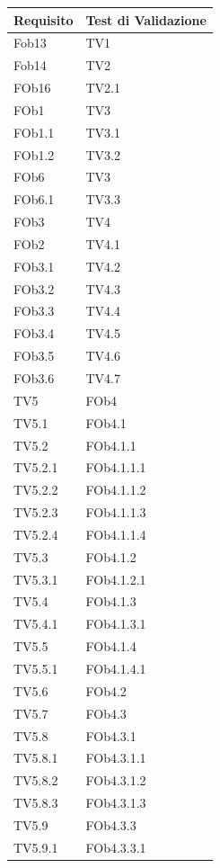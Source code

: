 \begin{longtable}{|p{2.5cm}|p{5cm}|}
	\hline
	\textbf{Requisito} & \textbf{Test di Validazione} \\
	\hline
	Fob13 & TV1\\
	\hline
	Fob14 & TV2\\
	\hline
	FOb16 & TV2.1\\
	\hline
	FOb1 & TV3\\
	\hline
	FOb1.1 & TV3.1\\
	\hline
	FOb1.2 & TV3.2\\
	\hline
	FOb6& TV3\\
	\hline
	FOb6.1 & TV3.3\\
	\hline
	FOb3 & TV4\\
	\hline
	FOb2 & TV4.1\\
	\hline
	FOb3.1 & TV4.2\\
	\hline
	FOb3.2 & TV4.3\\
	\hline
	FOb3.3 & TV4.4\\
	\hline
	FOb3.4 & TV4.5\\
	\hline
	FOb3.5 & TV4.6\\
	\hline
	FOb3.6 & TV4.7\\
\hline
TV5 & FOb4\\
\hline
TV5.1 & FOb4.1\\
\hline
TV5.2 & FOb4.1.1\\
\hline
TV5.2.1 & FOb4.1.1.1\\
\hline
TV5.2.2 & FOb4.1.1.2\\
\hline
TV5.2.3 & FOb4.1.1.3\\
\hline
TV5.2.4 & FOb4.1.1.4\\
\hline
TV5.3 & FOb4.1.2\\
\hline
TV5.3.1 & FOb4.1.2.1\\
\hline
TV5.4 & FOb4.1.3\\
\hline
TV5.4.1 & FOb4.1.3.1\\
\hline
TV5.5 & FOb4.1.4\\
\hline
TV5.5.1 & FOb4.1.4.1\\
\hline
TV5.6 & FOb4.2\\
\hline
TV5.7 & FOb4.3\\
\hline
TV5.8 & FOb4.3.1 \\ %
\hline
TV5.8.1 & FOb4.3.1.1\\
\hline
TV5.8.2 & FOb4.3.1.2\\
\hline
TV5.8.3 & FOb4.3.1.3\\
\hline
TV5.9 & FOb4.3.3\\ %
\hline
TV5.9.1 & FOb4.3.3.1\\

\end{longtable}
